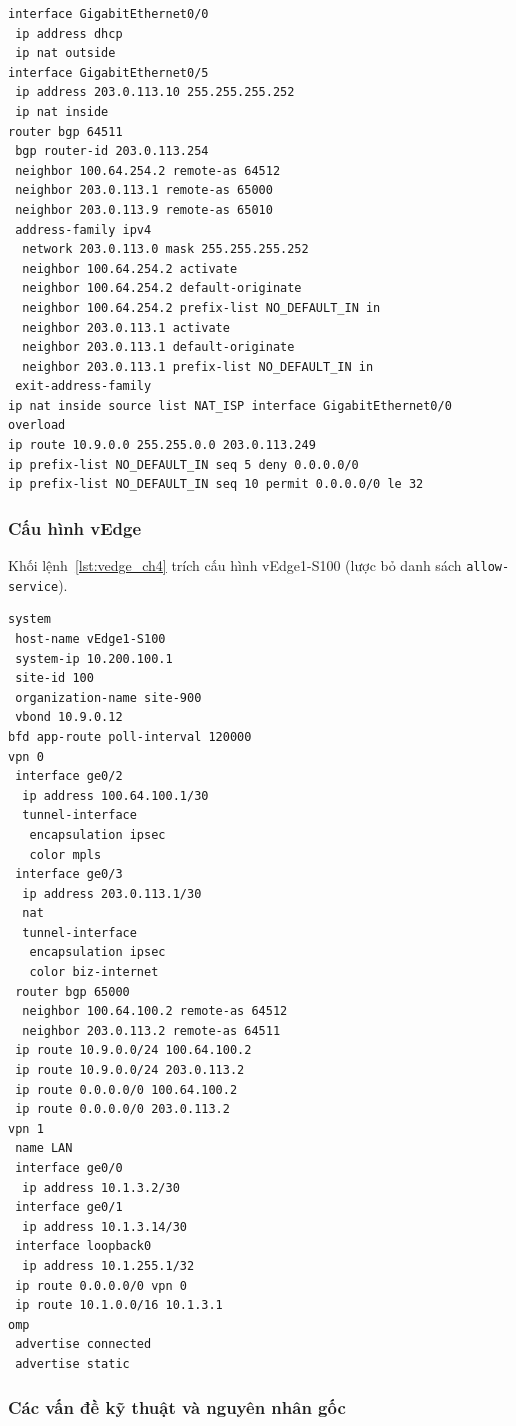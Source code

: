 \begin{lstlisting}[style=customcode,caption={Trích cấu hình BGP và NAT của router Internet},label={lst:isp_ch4}]
interface GigabitEthernet0/0
 ip address dhcp
 ip nat outside
interface GigabitEthernet0/5
 ip address 203.0.113.10 255.255.255.252
 ip nat inside
router bgp 64511
 bgp router-id 203.0.113.254
 neighbor 100.64.254.2 remote-as 64512
 neighbor 203.0.113.1 remote-as 65000
 neighbor 203.0.113.9 remote-as 65010
 address-family ipv4
  network 203.0.113.0 mask 255.255.255.252
  neighbor 100.64.254.2 activate
  neighbor 100.64.254.2 default-originate
  neighbor 100.64.254.2 prefix-list NO_DEFAULT_IN in
  neighbor 203.0.113.1 activate
  neighbor 203.0.113.1 default-originate
  neighbor 203.0.113.1 prefix-list NO_DEFAULT_IN in
 exit-address-family
ip nat inside source list NAT_ISP interface GigabitEthernet0/0 overload
ip route 10.9.0.0 255.255.0.0 203.0.113.249
ip prefix-list NO_DEFAULT_IN seq 5 deny 0.0.0.0/0
ip prefix-list NO_DEFAULT_IN seq 10 permit 0.0.0.0/0 le 32
\end{lstlisting}

\subsubsection{Cấu hình vEdge}

Khối lệnh~\ref{lst:vedge_ch4} trích cấu hình vEdge1-S100 (lược bỏ danh sách \texttt{allow-service}).

\begin{lstlisting}[style=customcode,caption={Trích cấu hình vEdge1-S100},label={lst:vedge_ch4}]
system
 host-name vEdge1-S100
 system-ip 10.200.100.1
 site-id 100
 organization-name site-900
 vbond 10.9.0.12
bfd app-route poll-interval 120000
vpn 0
 interface ge0/2
  ip address 100.64.100.1/30
  tunnel-interface
   encapsulation ipsec
   color mpls
 interface ge0/3
  ip address 203.0.113.1/30
  nat
  tunnel-interface
   encapsulation ipsec
   color biz-internet
 router bgp 65000
  neighbor 100.64.100.2 remote-as 64512
  neighbor 203.0.113.2 remote-as 64511
 ip route 10.9.0.0/24 100.64.100.2
 ip route 10.9.0.0/24 203.0.113.2
 ip route 0.0.0.0/0 100.64.100.2
 ip route 0.0.0.0/0 203.0.113.2
vpn 1
 name LAN
 interface ge0/0
  ip address 10.1.3.2/30
 interface ge0/1
  ip address 10.1.3.14/30
 interface loopback0
  ip address 10.1.255.1/32
 ip route 0.0.0.0/0 vpn 0
 ip route 10.1.0.0/16 10.1.3.1
omp
 advertise connected
 advertise static
\end{lstlisting}

\subsubsection{Các vấn đề kỹ thuật và nguyên nhân gốc}

